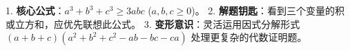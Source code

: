\begin{summarybox}
1. \textbf{核心公式}：$a^3+b^3+c^3 \geqslant 3abc$ ($a,b,c \geqslant 0$)。
2. \textbf{解题钥匙}：看到三个变量的积或立方和，应优先联想此公式。
3. \textbf{变形意识}：灵活运用因式分解形式 $(a+b+c)(a^2+b^2+c^2-ab-bc-ca)$ 处理更复杂的代数证明题。
\end{summarybox}